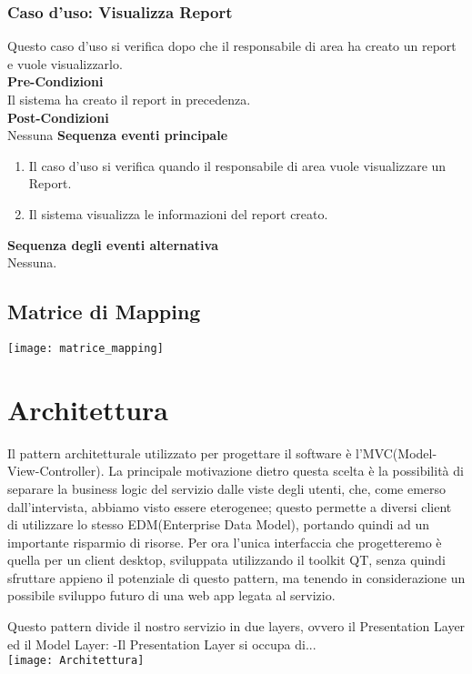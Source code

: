 \documentclass[green, fancy, 11pt]{elegantbook}
\begin{document}
\subsubsection{Caso d'uso: Visualizza Report}
\noindent
Questo caso d'uso si verifica dopo che il responsabile di area ha creato un report e vuole visualizzarlo.\\
\textbf{Pre-Condizioni}\\
Il sistema ha creato il report in precedenza.\\
\textbf{Post-Condizioni}\\
Nessuna
\textbf{Sequenza eventi principale}
\begin{enumerate}
	\item Il caso d'uso si verifica quando il responsabile di area vuole visualizzare un Report.
	\item Il sistema visualizza le informazioni del report creato.
\end{enumerate}
\textbf{Sequenza degli eventi alternativa}\\
Nessuna.
\newpage

{
\begin{landscape}
\subsection{Matrice di Mapping}
\scriptsize
\noindent \texttt{[image: matrice\_mapping]}
\end{landscape}
}

\section{Architettura}
\noindent
Il pattern architetturale utilizzato per progettare il software è l'MVC(Model-View-Controller). La principale motivazione dietro questa scelta è la possibilità di separare la business logic del servizio dalle viste degli utenti, che, come emerso dall'intervista, abbiamo visto essere eterogenee; questo permette a diversi client di utilizzare lo stesso EDM(Enterprise Data Model), portando quindi ad un importante risparmio
di risorse. Per ora l'unica interfaccia che progetteremo è quella per un client desktop, sviluppata utilizzando il toolkit QT, senza quindi sfruttare appieno il potenziale di questo pattern, ma tenendo in considerazione un possibile sviluppo futuro di una web app legata al servizio.

Questo pattern divide il nostro servizio in due layers, ovvero il Presentation Layer ed il Model Layer:
-Il Presentation Layer si occupa di...
\\
\texttt{[image: Architettura]}
\end{document}

